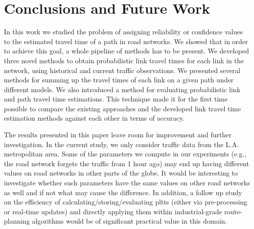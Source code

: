 \section{Conclusions and Future Work}
\label{sec:conclusion}
In this work we studied the problem of assigning reliability or confidence values to the estimated travel time of a path in road networks. We showed that in order to achieve this goal, a whole pipeline of methods has to be present. We developed three novel methods to obtain probabilistic link travel times for each link in the network, using historical and current traffic observations. We presented several methods for summing up the travel times of each link on a given path under different models. We also introduced a method for evaluating probabilistic link and path travel time estimations. This technique made it for the first time possible to compare the existing approaches and the developed link travel time estimation methods against each other in terms of accuracy.

The results presented in this paper leave room for improvement and further investigation. In the current study, we only consider traffic data from the L.A. metropolitan area. Some of the parameters we compute in our experiments (e.g., the road network forgets the traffic from 1 hour ago) may end up having different values on road networks in other parts of the globe. It would be interesting to investigate whether such parameters have the same values on other road networks as well and if not what may cause the difference. In addition, a follow up study on the efficiency of calculating/storing/evaluating pltts (either via pre-processing or real-time updates) and directly applying them within industrial-grade route-planning algorithms would be of significant practical value in this domain.
